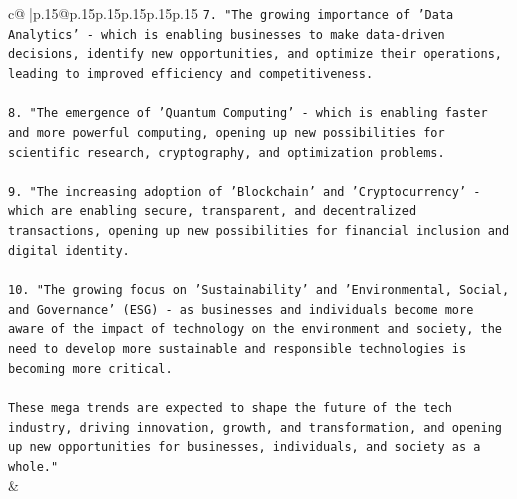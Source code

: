\documentclass{article}
\begin{document}
{\begin{supertabular}{c@{$\;$}|p{.15\linewidth}@{}p{.15\linewidth}p{.15\linewidth}p{.15\linewidth}p{.15\linewidth}p{.15\linewidth}}
{{{\texttt{7. "The growing importance of 'Data Analytics' {-} which is enabling businesses to make data{-}driven decisions, identify new opportunities, and optimize their operations, leading to improved efficiency and competitiveness.} \\
\\ 
\texttt{8. "The emergence of 'Quantum Computing' {-} which is enabling faster and more powerful computing, opening up new possibilities for scientific research, cryptography, and optimization problems.} \\
\\ 
\texttt{9. "The increasing adoption of 'Blockchain' and 'Cryptocurrency' {-} which are enabling secure, transparent, and decentralized transactions, opening up new possibilities for financial inclusion and digital identity.} \\
\\ 
\texttt{10. "The growing focus on 'Sustainability' and 'Environmental, Social, and Governance' (ESG) {-} as businesses and individuals become more aware of the impact of technology on the environment and society, the need to develop more sustainable and responsible technologies is becoming more critical.} \\
\\ 
\texttt{These mega trends are expected to shape the future of the tech industry, driving innovation, growth, and transformation, and opening up new opportunities for businesses, individuals, and society as a whole."} \\
            }
        }
    }
    & \\ \\


\end{supertabular}}
\end{document}
